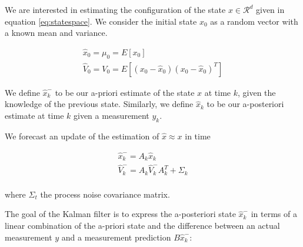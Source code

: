 \documentclass[mscthesis]{usiinfthesis}
\begin{document}


We are interested in estimating the configuration of the state $x \in \mathcal{R}^d$ given in equation \ref{eq:statespace}. We consider the initial state $x_0$ as a random vector with a known mean and variance.

\begin{eqfloat}
\begin{equation}
\begin{array}{l}
\hat{x}_0 = \mu_0 = E[x_0] \\
\hat{V}_0 = V_0 = E[(x_0-\hat{x}_0)(x_0-\hat{x}_0)^T] 
\end{array}
\label{eq:linear_kalman_init}
\end{equation}
\end{eqfloat}


We define $\hat{x}_k^-$ to be our a-priori estimate of the state $x$ at time $k$, given the knowledge of the previous state. Similarly, we define $\hat{x}_k$ to be our a-posteriori estimate at time $k$ given a measurement $y_k$. 

We forecast an update of the estimation of $\hat{x} \approx x$ in time

\begin{eqfloat}[H]
\begin{equation}
\begin{array}{l}
\hat{x}_k^- = A_k \hat{x}_k  \\
\hat{V}_k^- = A_k \hat{V}_k^- A_k^T + \Sigma_k \\
\end{array}
\label{eq:kalman_predict}
\end{equation}
\label{eq:linear_kalmann_prediction}
\end{eqfloat}

\noindent where $\Sigma_{t}$ the process noise covariance matrix. 


The goal of the Kalman filter is to express the a-posteriori state $\hat{x}_k^-$ in terms of a linear combination of the a-priori state and the difference between an actual measurement $y$ and a measurement prediction $B \hat{x}_k^-$:
\end{document}
